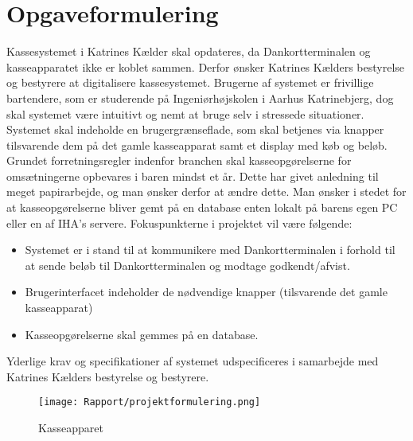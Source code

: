 \chapter{Opgaveformulering}
Kassesystemet i Katrines Kælder skal opdateres, da Dankortterminalen og kasseapparatet ikke er koblet sammen. Derfor ønsker Katrines Kælders bestyrelse og bestyrere at digitalisere kassesystemet.
\newline\newline
Brugerne af systemet er frivillige bartendere, som er studerende på Ingeniørhøjskolen i Aarhus Katrinebjerg, dog skal systemet være intuitivt og nemt at bruge selv i stressede situationer.
\newline\newline
Systemet skal indeholde en brugergrænseflade, som skal betjenes via knapper tilsvarende dem på det gamle kasseapparat samt et display med køb og beløb. 
\newline\newline
Grundet forretningsregler indenfor branchen skal kasseopgørelserne for omsætningerne opbevares i baren mindst et år. Dette har givet anledning til meget papirarbejde, og man ønsker derfor at ændre dette. Man ønsker i stedet for at kasseopgørelserne bliver gemt på en database enten lokalt på barens egen PC
eller en af \gls{IHA}’s servere.
\newline\newline
Fokuspunkterne i projektet vil være følgende:
\begin{itemize}
\item Systemet er i stand til at kommunikere med Dankortterminalen i forhold til at sende beløb til
Dankortterminalen og modtage godkendt/afvist.
\item Brugerinterfacet indeholder de nødvendige knapper (tilsvarende det gamle kasseapparat)
\item Kasseopgørelserne skal gemmes på en database.
\newline
\end{itemize}
Yderlige krav og specifikationer af systemet udspecificeres i samarbejde med Katrines Kælders bestyrelse
og bestyrere.

\begin{figure}[h]
    \centering
    \texttt{[image: Rapport/projektformulering.png]}
    \caption{Kasseapparet}
    \label{fig:kasseapparat}
\end{figure}